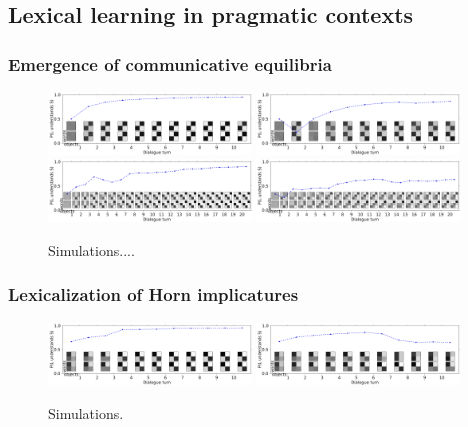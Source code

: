 \documentclass{article} %
\begin{document}
\subsection{Lexical learning in pragmatic contexts}

\subsubsection{Emergence of communicative equilibria}

\begin{figure}
\centering
\includegraphics[width=0.48\textwidth]{figures/emergence2x2-1.pdf}
\includegraphics[width=0.48\textwidth]{figures/emergence2x2-3.pdf} \\
\includegraphics[width=0.48\textwidth]{figures/emergence3x3-0.pdf}
\includegraphics[width=0.48\textwidth]{figures/emergence3x3-1.pdf} \\
\caption{\label{fig:emergence} Simulations....}
\end{figure}

\subsubsection{Lexicalization of Horn implicatures}

\begin{figure}
\centering
\includegraphics[width=0.48\textwidth]{figures/horn-emergence-0.pdf}
\includegraphics[width=0.48\textwidth]{figures/horn-emergence-1.pdf}
\caption{\label{fig:horn} Simulations.}
\end{figure}
\end{document}
